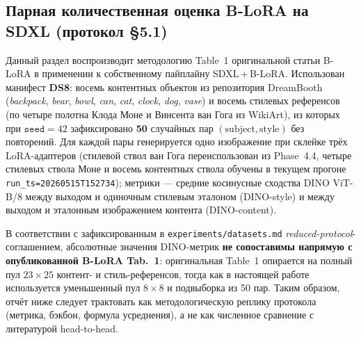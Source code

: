 %
%
%
%

\subsection{Парная количественная оценка B-LoRA на SDXL (протокол §5.1)}
\label{subsec:phase5_2_f02_quantitative}

Данный раздел воспроизводит методологию Table~1 оригинальной статьи B-LoRA в применении к собственному пайплайну SDXL\,+\,B-LoRA. Использован манифест \textbf{DS8}: восемь контентных объектов из репозитория DreamBooth (\textit{backpack}, \textit{bear}, \textit{bowl}, \textit{can}, \textit{cat}, \textit{clock}, \textit{dog}, \textit{vase}) и восемь стилевых референсов (по четыре полотна Клода Моне и Винсента ван Гога из WikiArt), из которых при $\mathtt{seed}=42$ зафиксировано \textbf{50} случайных пар $(\text{subject}, \text{style})$ без повторений. Для каждой пары генерируется одно изображение при склейке трёх LoRA-адаптеров (стилевой ствол ван Гога переиспользован из Phase~4.4, четыре стилевых ствола Моне и восемь контентных ствола обучены в текущем прогоне \texttt{run\_ts=20260515T152734}); метрики --- средние косинусные сходства DINO ViT-B/8 между выходом и одиночным стилевым эталоном (DINO-style) и между выходом и эталонным изображением контента (DINO-content).

В соответствии с зафиксированным в \texttt{experiments/datasets.md} \emph{reduced-protocol}-соглашением, абсолютные значения DINO-метрик \textbf{не сопоставимы напрямую с опубликованной B-LoRA Tab.~1}: оригинальная Table~1 опирается на полный пул $23\times25$ контент- и стиль-референсов, тогда как в настоящей работе используется уменьшенный пул $8\times8$ и подвыборка из 50 пар. Таким образом, отчёт ниже следует трактовать как методологическую реплику протокола (метрика, бэкбон, формула усреднения), а не как численное сравнение с литературой head-to-head.

